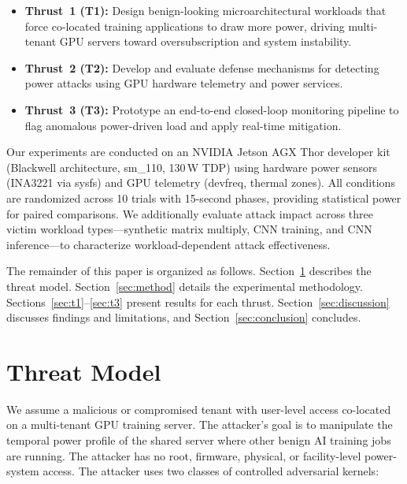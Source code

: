 \documentclass[conference]{IEEEtran}
\begin{document}
\begin{itemize}
\item \textbf{Thrust~1 (T1):} Design benign-looking microarchitectural
  workloads that force co-located training applications to draw more
  power, driving multi-tenant GPU servers toward oversubscription and
  system instability.
\item \textbf{Thrust~2 (T2):} Develop and evaluate defense mechanisms
  for detecting power attacks using GPU hardware telemetry and power
  services.
\item \textbf{Thrust~3 (T3):} Prototype an end-to-end closed-loop
  monitoring pipeline to flag anomalous power-driven load and apply
  real-time mitigation.
\end{itemize}

Our experiments are conducted on an NVIDIA Jetson AGX Thor developer
kit (Blackwell architecture, sm\_110, 130\,W TDP) using hardware
power sensors (INA3221 via sysfs) and GPU telemetry (devfreq, thermal
zones).  All conditions are randomized across 10 trials with
15-second phases, providing statistical power for paired comparisons.
We additionally evaluate attack impact across three victim workload
types---synthetic matrix multiply, CNN training, and CNN inference---to
characterize workload-dependent attack effectiveness.

The remainder of this paper is organized as follows.
Section~\ref{sec:threat} describes the threat model.
Section~\ref{sec:method} details the experimental methodology.
Sections~\ref{sec:t1}--\ref{sec:t3} present results for each thrust.
Section~\ref{sec:discussion} discusses findings and limitations, and
Section~\ref{sec:conclusion} concludes.

\section{Threat Model}
\label{sec:threat}

We assume a malicious or compromised tenant with user-level access
co-located on a multi-tenant GPU training server.  The attacker's goal
is to manipulate the temporal power profile of the shared server where
other benign AI training jobs are running.  The attacker has no root,
firmware, physical, or facility-level power-system access.  The
attacker uses two classes of controlled adversarial kernels:
\end{document}
